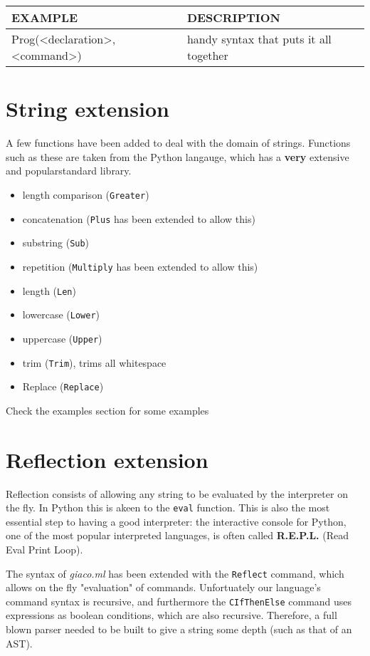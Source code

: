 \documentclass[11pt]{article}
\begin{document}
\begin{center}
\begin{tabular}{ll}
EXAMPLE & DESCRIPTION\\
\hline
Prog(<declaration>, <command>) & handy syntax that puts it all together\\
\end{tabular}
\end{center}
\section{String extension}
\label{sec:orgac519da}
A few functions have been added to deal with the domain of strings.
Functions such as these are taken from the Python langauge, which has a \textbf{very} extensive and popularstandard library.
\begin{itemize}
\item length comparison (\texttt{Greater})
\item concatenation (\texttt{Plus} has been extended to allow this)
\item substring (\texttt{Sub})
\item repetition (\texttt{Multiply} has been extended to allow this)
\item length (\texttt{Len})
\item lowercase (\texttt{Lower})
\item uppercase (\texttt{Upper})
\item trim (\texttt{Trim}), trims all whitespace
\item Replace (\texttt{Replace})
\end{itemize}

Check the examples section for some examples
\section{Reflection extension}
\label{sec:orgb2c4cba}
Reflection consists of allowing any string to be evaluated by the interpreter on the fly. In Python this is akeen to the \texttt{eval} function.
This is also the most essential step to having a good interpreter: the interactive console for Python,
 one of the most popular interpreted languages, is often called \textbf{R.E.P.L.} (Read Eval Print Loop).

The syntax of \emph{giaco.ml} has been extended with the \texttt{Reflect} command, which allows on the fly "evaluation" of commands.
Unfortuately our language's command syntax is recursive, and furthermore the \texttt{CIfThenElse} command
uses expressions as boolean conditions, which are also recursive.
Therefore, a full blown parser needed to be built to give a string some depth (such as that of an AST).
\end{document}
